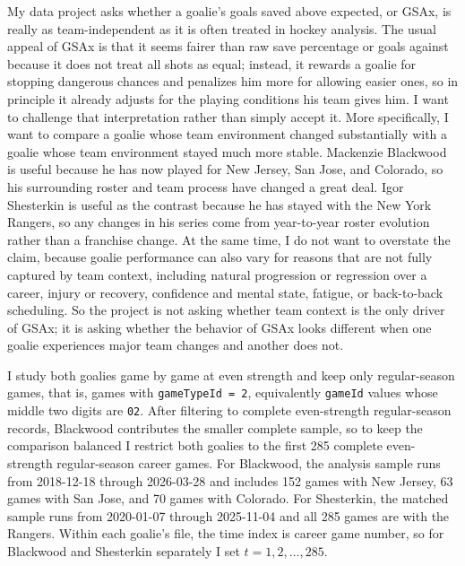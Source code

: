 \documentclass[
  10pt,
]{extarticle}
\begin{document}
My data project asks whether a goalie's goals saved above expected, or GSAx, is really as team-independent as it is often treated in hockey analysis. The usual appeal of GSAx is that it seems fairer than raw save percentage or goals against because it does not treat all shots as equal; instead, it rewards a goalie for stopping dangerous chances and penalizes him more for allowing easier ones, so in principle it already adjusts for the playing conditions his team gives him. I want to challenge that interpretation rather than simply accept it. More specifically, I want to compare a goalie whose team environment changed substantially with a goalie whose team environment stayed much more stable. Mackenzie Blackwood is useful because he has now played for New Jersey, San Jose, and Colorado, so his surrounding roster and team process have changed a great deal. Igor Shesterkin is useful as the contrast because he has stayed with the New York Rangers, so any changes in his series come from year-to-year roster evolution rather than a franchise change. At the same time, I do not want to overstate the claim, because goalie performance can also vary for reasons that are not fully captured by team context, including natural progression or regression over a career, injury or recovery, confidence and mental state, fatigue, or back-to-back scheduling. So the project is not asking whether team context is the only driver of GSAx; it is asking whether the behavior of GSAx looks different when one goalie experiences major team changes and another does not.

I study both goalies game by game at even strength and keep only regular-season games, that is, games with \texttt{gameTypeId\ =\ 2}, equivalently \texttt{gameId} values whose middle two digits are \texttt{02}. After filtering to complete even-strength regular-season records, Blackwood contributes the smaller complete sample, so to keep the comparison balanced I restrict both goalies to the first 285 complete even-strength regular-season career games. For Blackwood, the analysis sample runs from 2018-12-18 through 2026-03-28 and includes 152 games with New Jersey, 63 games with San Jose, and 70 games with Colorado. For Shesterkin, the matched sample runs from 2020-01-07 through 2025-11-04 and all 285 games are with the Rangers. Within each goalie's file, the time index is career game number, so for Blackwood and Shesterkin separately I set \(t = 1, 2, \ldots, 285\).
\end{document}
